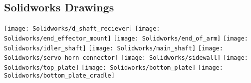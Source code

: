 \begin{flushleft}
\section{Solidworks Drawings}
\end{flushleft}
\label{app:SolidworksDrawings}
\centering
\texttt{[image: Solidworks/d\_shaft\_reciever]} \newpage
\texttt{[image: Solidworks/end\_effector\_mount]} \newpage
\texttt{[image: Solidworks/end\_of\_arm]} \newpage
\texttt{[image: Solidworks/idler\_shaft]} \newpage
\texttt{[image: Solidworks/main\_shaft]} \newpage
\texttt{[image: Solidworks/servo\_horn\_connector]} \newpage
\texttt{[image: Solidworks/sidewall]} \newpage
\texttt{[image: Solidworks/top\_plate]} \newpage
\texttt{[image: Solidworks/bottom\_plate]} \newpage
\texttt{[image: Solidworks/bottom\_plate\_cradle]} \newpage


